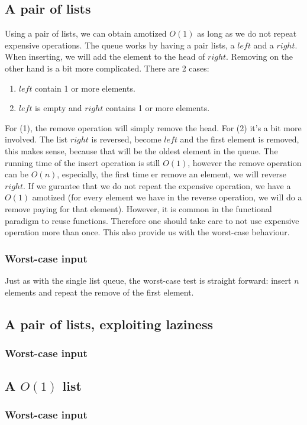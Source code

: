 \subsection*{A pair of lists}
Using a pair of lists, we can obtain amotized $O(1)$ as long as we do not repeat expensive operations. The queue works by having a pair lists, a $left$ and a $right$. When inserting, we will add the element to the head of $right$. Removing on the other hand is a bit more complicated. There are 2 cases:
\begin{enumerate}
	\item $left$ contain 1 or more elements.
	\item $left$ is empty and $right$ contains 1 or more elements.
\end{enumerate}
For (1), the remove operation will simply remove the head. For (2) it's a bit more involved. The list $right$ is reversed, become $left$ and the first element is removed, this makes sense, because that will be the oldest element in the queue. The running time of the insert operation is still $O(1)$, however the remove operation can be $O(n)$, especially, the first time er remove an element, we will reverse $right$. If we gurantee that we do not repeat the expensive operation, we have a $O(1)$ amotized (for every element we have in the reverse operation, we will do a remove paying for that element). However, it is common in the functional paradigm to reuse functions. Therefore one should take care to not use expensive operation more than once. This also provide us with the worst-case behaviour.

\subsubsection{Worst-case input}
Just as with the single list queue, the worst-case test is straight forward: insert $n$ elements and repeat the remove of the first element.

\subsection*{A pair of lists, exploiting laziness}

\subsubsection{Worst-case input}

\subsection*{A $O(1)$ list}

\subsubsection{Worst-case input}
